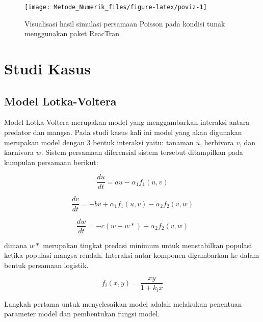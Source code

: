 \documentclass[
]{book}
\theoremstyle{definition}
\theoremstyle{definition}
\theoremstyle{definition}
\theoremstyle{definition}
\theoremstyle{remark}
\begin{document}
\begin{figure}

{\centering \texttt{[image: Metode\_Numerik\_files/figure-latex/poviz-1]} 

}

\caption{Visualisasi hasil simulasi persamaan Poisson pada kondisi tunak menggunakan paket ReacTran}\label{fig:poviz}
\end{figure}

\hypertarget{studi-kasus-3}{%
\section{Studi Kasus}\label{studi-kasus-3}}

\hypertarget{model-lotka-voltera}{%
\subsection{Model Lotka-Voltera}\label{model-lotka-voltera}}

Model Lotka-Voltera merupakan model yang menggambarkan interaksi antara predator dan mangsa. Pada studi kasus kali ini model yang akan digunakan merupakan model dengan 3 bentuk interaksi yaitu: tanaman \(u\), herbivora \(v\), dan karnivora \(w\). Sistem persamaan diferensial sistem tersebut ditampilkan pada kumpulan persamaan berikut:

\begin{equation}
\frac{du}{dt}=au-\alpha_1f_1\left(u,v\right)
  \label{eq:lv}
\end{equation}

\begin{equation}
\frac{dv}{dt}=-bv+\alpha_1f_1\left(u,v\right)-\alpha_2f_2\left(v,w\right)
  \label{eq:lv2}
\end{equation}

\begin{equation}
\frac{dw}{dt}=-c\left(w-w\ast\right)+\alpha_2f_2\left(v,w\right)
  \label{eq:lv3}
\end{equation}

dimana \(w\ast\) merupakan tingkat predasi minimum untuk menstabilkan populasi ketika populasi mangsa rendah. Interaksi antar komponen digambarkan ke dalam bentuk persamaan logistik.

\begin{equation}
f_i\left(x,y\right)=\frac{xy}{1+k_ix}
  \label{eq:lv4}
\end{equation}

Langkah pertama untuk menyelesaikan model adalah melakukan penentuan parameter model dan pembentukan fungsi model.
\end{document}
